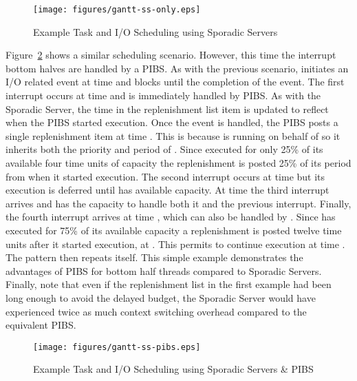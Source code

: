 \begin{figure}[h]
  \centering
  \texttt{[image: figures/gantt-ss-only.eps]}
  \vspace{0.05in}
  \caption{Example Task and I/O Scheduling using Sporadic Servers}

  \label{fig:gantt_ss_only}
\end{figure}

Figure~\ref{fig:gantt_ss_pibs} shows a similar scheduling scenario. However,
this time the interrupt bottom halves are handled by a PIBS.  As with the
previous scenario,  initiates an I/O related event at time  and
blocks until the completion of the event.  The first interrupt occurs at time
 and is immediately handled by PIBS.  As with the Sporadic Server, the
time in the replenishment list item is updated to reflect when the PIBS
started execution.  Once the event is handled, the PIBS posts a single
replenishment item at time .  This is because  is running on
behalf of  so it inherits both the priority and period of .
Since  executed for only 25\% of its available four time units of
capacity the replenishment is posted 25\% of its period from when it started
execution.  The second interrupt occurs at time  but its execution is
deferred until  has available capacity.  At time  the third
interrupt arrives and  has the capacity to handle both it and the
previous interrupt.  Finally, the fourth interrupt arrives at time ,
which can also be handled by .  Since  has executed for 75\%
of its available capacity a replenishment is posted twelve time units after it
started execution, at .  This permits  to continue execution
at time .  The pattern then repeats itself.  This simple example
demonstrates the advantages of PIBS for bottom half threads compared to
Sporadic Servers.  Finally, note that even if the replenishment list in the
first example had been long enough to avoid the delayed budget, the Sporadic
Server would have experienced twice as much context switching overhead
compared to the equivalent PIBS.

\begin{figure}[h]
  \vspace{-0.15in}
  \centering
  \texttt{[image: figures/gantt-ss-pibs.eps]}
  \vspace{0.05in}
  \caption{Example Task and I/O Scheduling using Sporadic Servers \& PIBS}

  \label{fig:gantt_ss_pibs}
  \vspace{-0.15in}
\end{figure}

